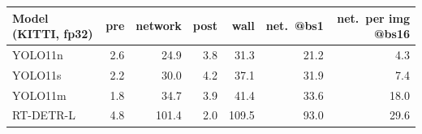 \begin{tabular}{lrrrrrr}
\toprule
Model (KITTI, fp32) & pre & network & post & wall & net.\ @bs1 & net.\ per img @bs16 \\
\midrule
YOLO11n & 2.6 & 24.9 & 3.8 & 31.3 & 21.2 & 4.3 \\
YOLO11s & 2.2 & 30.0 & 4.2 & 37.1 & 31.9 & 7.4 \\
YOLO11m & 1.8 & 34.7 & 3.9 & 41.4 & 33.6 & 18.0 \\
RT-DETR-L & 4.8 & 101.4 & 2.0 & 109.5 & 93.0 & 29.6 \\
\bottomrule
\end{tabular}

